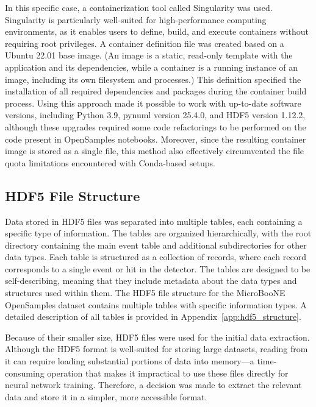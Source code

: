 \documentclass{pracalicmgr}
\begin{document}
In this specific case, a containerization tool called Singularity was used. Singularity is particularly well-suited for high-performance computing environments, as it enables users to define, build, and execute containers without requiring root privileges. A container definition file was created based on a Ubuntu 22.01 base image. (An image is a static, read-only template with the application and its dependencies, while a container is a running instance of an image, including its own filesystem and processes.) This definition specified the installation of all required dependencies and packages during the container build process. Using this approach made it possible to work with up-to-date software versions, including Python 3.9, pynuml version 25.4.0, and HDF5 version 1.12.2, although these upgrades required some code refactorings to be performed on the code present in OpenSamples notebooks. Moreover, since the resulting container image is stored as a single file, this method also effectively circumvented the file quota limitations encountered with Conda-based setups.

\subsection{HDF5 File Structure}

Data stored in HDF5 files was separated into multiple tables, each containing a specific type of information. The tables are organized hierarchically, with the root directory containing the main event table and additional subdirectories for other data types. Each table is structured as a collection of records, where each record corresponds to a single event or hit in the detector. The tables are designed to be self-describing, meaning that they include metadata about the data types and structures used within them.
The HDF5 file structure for the MicroBooNE OpenSamples dataset contains multiple tables with specific information types. A detailed description of all tables is provided in Appendix~\ref{app:hdf5_structure}.

Because of their smaller size, HDF5 files were used for the initial data extraction. Although the HDF5 format is well-suited for storing large datasets, reading from it can require loading substantial portions of data into memory—a time-consuming operation that makes it impractical to use these files directly for neural network training. Therefore, a decision was made to extract the relevant data and store it in a simpler, more accessible format.
\end{document}
